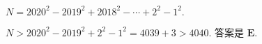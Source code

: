 \begin{prob}
\label{prob:prob-6}
$N = 2020^2 - 2019^2 + 2018^2 - \cdots + 2^2 - 1^2.$
\end{prob}

\begin{soln}
$N > 2020^2 - 2019^2 + 2^2 - 1^2 = 4039 + 3 > 4040$.
答案是 $\boxed{\textbf{E}.}$
\end{soln}
